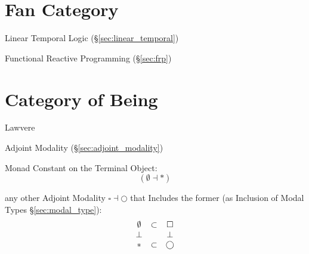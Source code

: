\section{Fan Category}\label{sec:fan_category}


Linear Temporal Logic (\S\ref{sec:linear_temporal})

Functional Reactive Programming (\S\ref{sec:frp})



\section{Category of Being}\label{sec:category_of_being}

Lawvere

Adjoint Modality (\S\ref{sec:adjoint_modality})

Monad Constant on the Terminal Object:
\[
  (\emptyset \dashv *)
\]

any other Adjoint Modality $\square \dashv \bigcirc$ that Includes the
former (as Inclusion of Modal Types \S\ref{sec:modal_type}):
\[
  \begin{matrix}
    \emptyset & \subset & \square \\
    \bot & \empty & \bot \\
    * & \subset & \bigcirc
  \end{matrix}
\]
